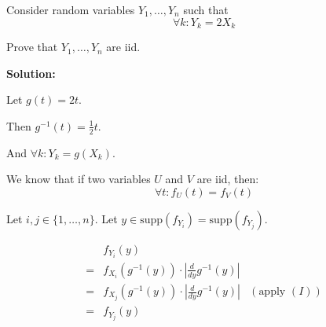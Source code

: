 \documentclass{article}
\begin{document}
Consider random variables \(Y_1,\ldots, Y_n\) such that
\[\forall k:Y_k=2X_k\]

Prove that \(Y_1,\ldots,Y_n\) are iid.

\textbf{Solution:}

Let \(g(t) = 2t\).

Then \(g^{-1}(t) = \frac12 t\).

And \(\forall k: Y_k=g(X_k)\).

We know that if two variables \(U\) and \(V\) are iid, then:
\[\forall t: f_U(t) = f_V(t) \tag{1}\]

Let \(i,j\in \{1,\ldots,n\}\). Let \(y\in \text{supp}(f_{Y_i})=\text{supp}(f_{Y_j})\).

\begin{align*}
     & f_{Y_i}(y) \\
    =& f_{X_i}(g^{-1}(y)) \cdot \left|\frac{d}{dy} g^{-1}(y)\right| \\
    =& f_{X_j}(g^{-1}(y)) \cdot \left|\frac{d}{dy} g^{-1}(y)\right| & (\text{apply } (I)) \\
    =& f_{Y_j}(y)
\end{align*}
\end{document}
